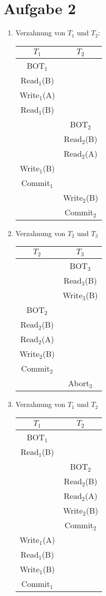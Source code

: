 \documentclass{article}
\begin{document}
	\section*{Aufgabe 2}
	\begin{enumerate}[label=(\alph*)]
		\item Verzahnung von $T_1$ und $T_2$:
		\begin{center}
			\begin{tabular}{c|c}
				$T_1$ & $T_2$ \\
				\hline
				BOT$_1$ & \\
				Read$_1$(B) & \\
				Write$_1$(A) & \\
				Read$_1$(B) & \\
				& BOT$_2$ \\
				& Read$_2$(B) \\
				& Read$_2$(A) \\
				Write$_1$(B) & \\
				Commit$_1$ & \\
				& Write$_2$(B) \\
				& Commit$_2$
			\end{tabular}
		\end{center}
		\item Verzahnung von $T_2$ und $T_3$
		\begin{center}
			\begin{tabular}{c|c}
				$T_2$ & $T_3$ \\
				\hline
				& BOT$_3$ \\
				& Read$_3$(B) \\
				& Write$_3$(B) \\
				BOT$_2$ & \\
				Read$_2$(B) & \\
				Read$_2$(A) & \\
				Write$_2$(B) & \\
				Commit$_2$ & \\
				& Abort$_3$
			\end{tabular}
		\end{center}
		\item Verzahnung von $T_1$ und $T_2$
		\begin{center}
			\begin{tabular}{c|c}
				$T_1$ & $T_2$ \\
				\hline
				BOT$_1$ & \\
				Read$_1$(B) & \\
				& BOT$_2$ \\
				& Read$_2$(B) \\
				& Read$_2$(A) \\
				& Write$_2$(B) \\
				& Commit$_2$ \\
				Write$_1$(A) & \\
				Read$_1$(B) & \\
				Write$_1$(B) & \\
				Commit$_1$ & 
			\end{tabular}
		\end{center}
	\end{enumerate}
\end{document}
